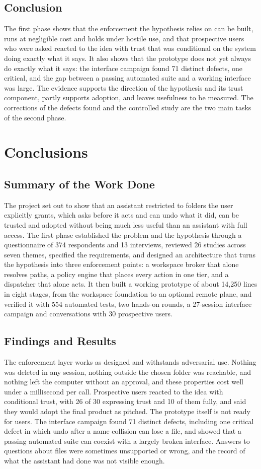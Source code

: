 \documentclass{FastFyp}
\begin{document}
\section{Conclusion}
The first phase shows that the enforcement the hypothesis relies on can be built, runs at negligible cost and holds under hostile use, and that prospective users who were asked reacted to the idea with trust that was conditional on the system doing exactly what it says. It also shows that the prototype does not yet always do exactly what it says: the interface campaign found 71 distinct defects, one critical, and the gap between a passing automated suite and a working interface was large. The evidence supports the direction of the hypothesis and its trust component, partly supports adoption, and leaves usefulness to be measured. The corrections of the defects found and the controlled study are the two main tasks of the second phase.

\chapter{Conclusions}
\section{Summary of the Work Done}
The project set out to show that an assistant restricted to folders the user explicitly grants, which asks before it acts and can undo what it did, can be trusted and adopted without being much less useful than an assistant with full access. The first phase established the problem and the hypothesis through a questionnaire of 374 respondents and 13 interviews, reviewed 26 studies across seven themes, specified the requirements, and designed an architecture that turns the hypothesis into three enforcement points: a workspace broker that alone resolves paths, a policy engine that places every action in one tier, and a dispatcher that alone acts. It then built a working prototype of about 14,250 lines in eight stages, from the workspace foundation to an optional remote plane, and verified it with 554 automated tests, two hands-on rounds, a 27-session interface campaign and conversations with 30 prospective users.

\section{Findings and Results}
The enforcement layer works as designed and withstands adversarial use. Nothing was deleted in any session, nothing outside the chosen folder was reachable, and nothing left the computer without an approval, and these properties cost well under a millisecond per call. Prospective users reacted to the idea with conditional trust, with 26 of 30 expressing trust and 10 of them fully, and said they would adopt the final product as pitched. The prototype itself is not ready for users. The interface campaign found 71 distinct defects, including one critical defect in which undo after a name collision can lose a file, and showed that a passing automated suite can coexist with a largely broken interface. Answers to questions about files were sometimes unsupported or wrong, and the record of what the assistant had done was not visible enough.
\end{document}
